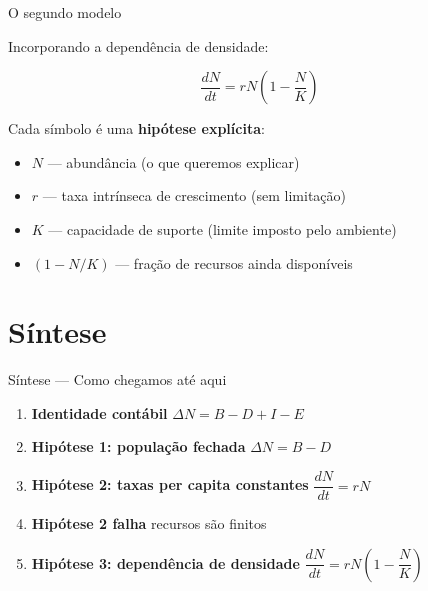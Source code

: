 \documentclass[12pt]{beamer}
\begin{document}
\begin{frame}{O segundo modelo}

  Incorporando a dependência de densidade:

  \[
    \boxed{\frac{dN}{dt} = rN\!\left(1 - \frac{N}{K}\right)}
  \]

  \bigskip
  Cada símbolo é uma \textbf{hipótese explícita}:

  \bigskip
  \begin{itemize}
    \item $N$ --- abundância (o que queremos explicar)
    \item $r$ --- taxa intrínseca de crescimento (sem limitação)
    \item $K$ --- capacidade de suporte (limite imposto pelo ambiente)
    \item $(1 - N/K)$ --- fração de recursos ainda disponíveis
  \end{itemize}

\end{frame}

\section{Síntese}

\begin{frame}{Síntese — Como chegamos até aqui}

  \begin{enumerate}
    \item \textbf{Identidade contábil} \hfill $\Delta N = B - D + I - E$
    \bigskip
    \item \textbf{Hipótese 1: população fechada} \hfill $\Delta N = B - D$
    \bigskip
    \item \textbf{Hipótese 2: taxas per capita constantes}
      \hfill $\dfrac{dN}{dt} = rN$
    \bigskip
    \item \textbf{Hipótese 2 falha} \hfill recursos são finitos
    \bigskip
    \item \textbf{Hipótese 3: dependência de densidade}
      \hfill $\dfrac{dN}{dt} = rN\!\left(1 - \dfrac{N}{K}\right)$
  \end{enumerate}

\end{frame}
\end{document}

